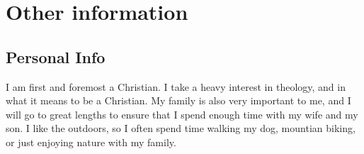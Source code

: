 \documentclass[a4paper]{twentysecondcv} %
\begin{document}

\section{Other information}

\subsection{Personal Info}

I am first and foremost a Christian. I take a heavy interest in theology, and in what it means to be a Christian.
My family is also very important to me, and I will go to great lengths to ensure that I spend enough time with my wife and my son.
I like the outdoors, so I often spend time walking my dog, mountian biking, or just enjoying nature with my family.






\end{document}
